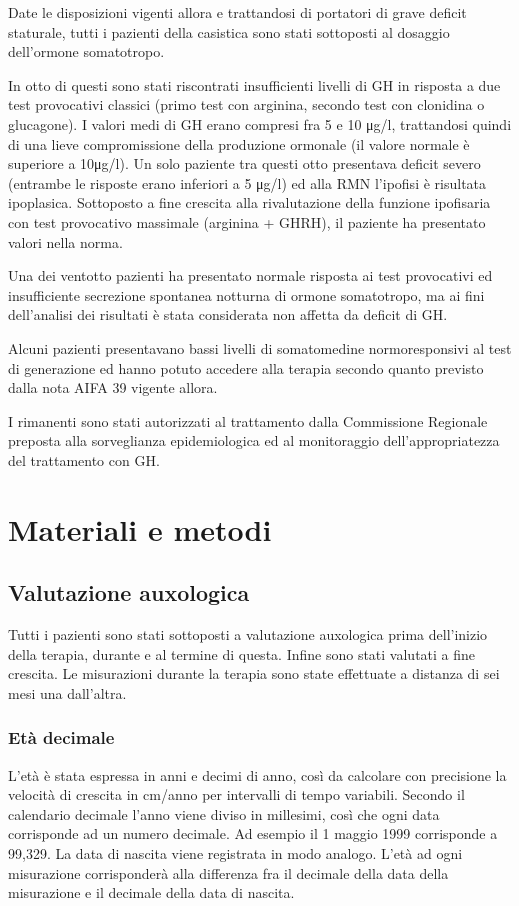 Date le disposizioni vigenti allora e trattandosi di portatori di grave deficit staturale, tutti i pazienti della casistica sono stati sottoposti al dosaggio dell'ormone somatotropo. 

In otto di questi sono stati riscontrati insufficienti livelli di GH in risposta a due test provocativi classici (primo test con arginina, secondo test con clonidina o glucagone). I valori medi di GH erano compresi fra 5 e 10 \unit{\micro g}/l, trattandosi quindi di una lieve compromissione della produzione ormonale (il valore normale è superiore a 10\unit{\micro g}/l). Un solo paziente tra questi otto presentava deficit severo (entrambe le risposte erano inferiori a 5 \unit{\micro g}/l) ed alla RMN l'ipofisi è risultata ipoplasica. Sottoposto a fine crescita alla rivalutazione della funzione ipofisaria con test provocativo massimale (arginina + GHRH), il paziente ha presentato valori nella norma.

 Una dei ventotto pazienti ha presentato normale risposta ai test provocativi ed insufficiente secrezione spontanea notturna di ormone somatotropo, ma ai fini dell'analisi dei risultati è stata considerata non affetta da deficit di GH.
 
 Alcuni pazienti presentavano bassi livelli di somatomedine normoresponsivi al test di generazione ed hanno potuto accedere alla terapia secondo quanto previsto dalla nota AIFA 39 vigente allora.
 
 I rimanenti sono stati autorizzati al trattamento dalla Commissione Regionale preposta alla sorveglianza epidemiologica ed al monitoraggio dell'appropriatezza del trattamento con GH. 

\section{Materiali e metodi}

\subsection{Valutazione auxologica}
Tutti i pazienti sono stati sottoposti a valutazione auxologica prima dell'inizio della terapia, durante e al termine di questa. Infine sono stati valutati a fine crescita. Le misurazioni durante la terapia sono state effettuate a distanza di sei mesi una dall'altra.

\subsubsection*{Età decimale}
L'età è stata espressa in anni e decimi di anno, così da calcolare con precisione la velocità di crescita in cm/anno per intervalli di tempo variabili. Secondo il calendario decimale l'anno viene diviso in millesimi, così che ogni data corrisponde ad un numero decimale. Ad esempio il 1 maggio 1999 corrisponde a 99,329. La data di nascita viene registrata in modo analogo. L'età ad ogni misurazione corrisponderà alla differenza fra il decimale della data della misurazione e il decimale della data di nascita\cite{tanner1990foetus}.    


